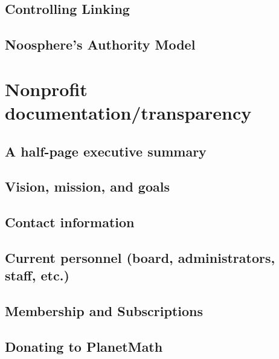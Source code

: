 \documentclass[12pt,report]{memoir}
\begin{document}
\section{Controlling Linking}


\section{Noosphere's Authority Model}


\chapter{Nonprofit documentation/transparency}


\section{A half-page executive summary}


\section{Vision, mission, and goals}


\section{Contact information}


\section{Current personnel (board, administrators, staff, etc.)}


\section{Membership and Subscriptions}


\section{Donating to PlanetMath}

\end{document}
